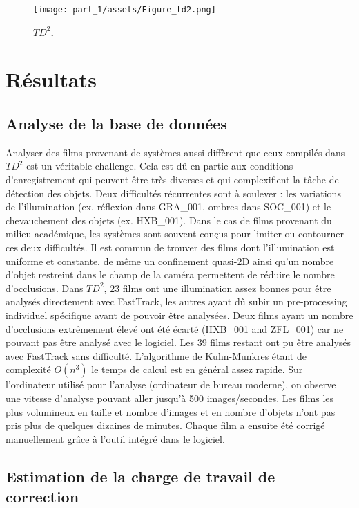 	\begin{figure}[h]
    \centering
    \texttt{[image: part\_1/assets/Figure\_td2.png]}    
    \caption{\textbf{$TD^2$.}}
    \label{part_1:fig_5}
    \end{figure}


\chapter{Résultats}

	\section{Analyse de la base de données}

  Analyser des films provenant de systèmes aussi diffèrent que ceux compilés dans $TD^2$ est un véritable challenge. Cela est dû en partie aux conditions d'enregistrement qui peuvent être très diverses et qui complexifient la tâche de détection des objets. Deux difficultés récurrentes sont à soulever : les variations de l'illumination (ex. réflexion dans GRA\_001, ombres dans SOC\_001) et le chevauchement des objets (ex. HXB\_001).
  Dans le cas de films provenant du milieu académique, les systèmes sont souvent conçus pour limiter ou contourner ces deux difficultés. Il est commun de trouver des films dont l'illumination est uniforme et constante. de même un confinement quasi-2D ainsi qu'un nombre d'objet restreint dans le champ de la caméra permettent de réduire le nombre d'occlusions.
  Dans $TD^2$, 23 films ont une illumination assez bonnes pour être analysés directement avec FastTrack, les autres ayant dû subir un pre-processing individuel spécifique avant de pouvoir être analysées. Deux films ayant un nombre d'occlusions extrêmement élevé ont été écarté (HXB\_001 and ZFL\_001) car ne pouvant pas être analysé avec le logiciel.
  Les 39 films restant ont pu être analysés avec FastTrack sans difficulté. L'algorithme de Kuhn-Munkres étant de complexité $O(n^3)$ le temps de calcul est en général assez rapide. Sur l'ordinateur utilisé pour l'analyse (ordinateur de bureau moderne), on observe une vitesse d'analyse pouvant aller jusqu’à 500 images/secondes. Les films les plus volumineux en taille et nombre d'images et en nombre d'objets n'ont pas pris plus de quelques dizaines de minutes. Chaque film a ensuite été corrigé manuellement grâce à l'outil intégré dans le logiciel.
	
	\section{Estimation de la charge de travail de correction}
	
